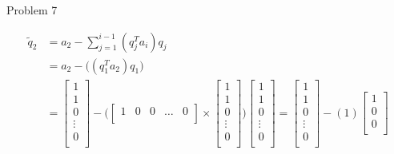 \begin{problem}{Problem 7}
\begin{highlight}[Solution]
        \begin{align}
            \tilde{q}_{2} & = a_{2} - \sum_{j = 1}^{i - 1} (q_{j}^{T}a_{i})q_{j} \\
            & = a_{2} - \Bigg( (q_{1}^{T}a_{2})q_{1} \Bigg) \\
            & = 
            \begin{bmatrix}
                1 \\
                1 \\
                0 \\
                \vdots \\
                0 \\
            \end{bmatrix}
            - \Bigg(
            \begin{bmatrix}
                1 & 0 & 0 & \dots & 0 \\
            \end{bmatrix}
            \times
            \begin{bmatrix}
                1 \\
                1 \\
                0 \\
                \vdots \\
                0 \\
            \end{bmatrix}
            \Bigg)
            \begin{bmatrix}
                1 \\
                1 \\
                0 \\
                \vdots \\
                0 \\
            \end{bmatrix} 
            = 
            \begin{bmatrix}
                1 \\
                1 \\
                0 \\
                \vdots \\
                0 \\
            \end{bmatrix}
            - (1)
            \begin{bmatrix}
                1 \\
                0 \\
                0 \\

\end{bmatrix}
\end{align}
\end{highlight}
\end{problem}

